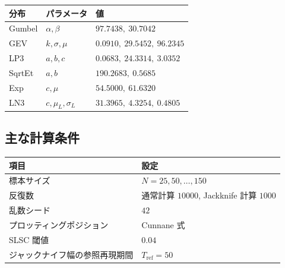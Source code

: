 \begin{center}
\small
\setlength{\tabcolsep}{5pt}
\begin{tabular}{lll}
\hline
分布 & パラメータ & 値 \\
\hline
Gumbel & \(\alpha,\beta\) & \(97.7438,\ 30.7042\) \\
GEV & \(k,\sigma,\mu\) & \(0.0910,\ 29.5452,\ 96.2345\) \\
LP3 & \(a,b,c\) & \(0.0683,\ 24.3314,\ 3.0352\) \\
SqrtEt & \(a,b\) & \(190.2683,\ 0.5685\) \\
Exp & \(c,\mu\) & \(54.5000,\ 61.6320\) \\
LN3 & \(c,\mu_L,\sigma_L\) & \(31.3965,\ 4.3254,\ 0.4805\) \\
\hline
\end{tabular}
\end{center}

\endgroup

\subsection{主な計算条件}

\begin{center}
\small
\setlength{\tabcolsep}{5pt}
\begin{tabular}{ll}
\hline
項目 & 設定 \\
\hline
標本サイズ & \(N=25,50,\ldots,150\) \\
反復数 & 通常計算 \(10000\), Jackknife 計算 \(1000\) \\
乱数シード & \(42\) \\
プロッティングポジション & Cunnane 式 \\
SLSC 閾値 & \(0.04\) \\
ジャックナイフ幅の参照再現期間 & \(T_{\mathrm{ref}}=50\) \\
\hline
\end{tabular}
\end{center}

